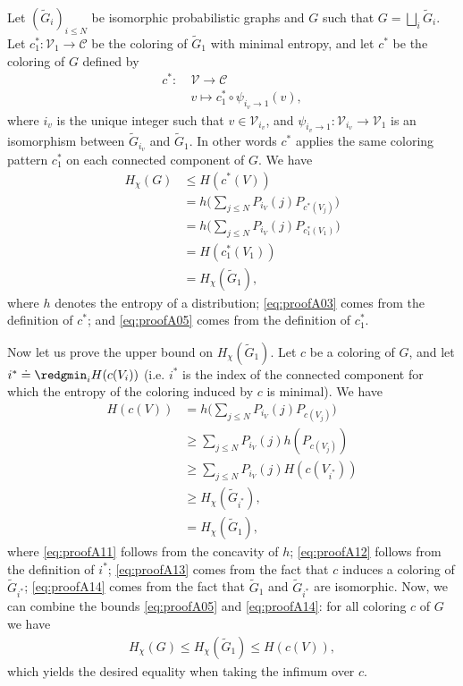 \documentclass[conference,a4paper]{IEEEtran}
\begin{document}
    Let $(\tilde{G}_i)_{i \leq N}$ be isomorphic probabilistic graphs and $G$ such that $G = \bigsqcup_i \tilde{G}_i$. Let $c_1^* : \mathcal{V}_1 \rightarrow \mathcal{C}$ be the coloring of $\tilde{G}_1$ with minimal entropy, and let $c^*$ be the coloring of $G$ defined by
    \begin{align}
        c^* : \: & \mathcal{V} \rightarrow \mathcal{C} \\
        & v \mapsto c_1^* \circ \psi_{i_v \rightarrow 1}(v),
    \end{align}
    where $i_v$ is the unique integer such that $v \in \mathcal{V}_{i_v}$, and $\psi_{i_v \rightarrow 1} : \mathcal{V}_{i_v} \rightarrow \mathcal{V}_1$ is an isomorphism between $\tilde{G}_{i_v}$ and $\tilde{G}_1$. In other words $c^*$ applies the same coloring pattern $c^*_1$ on each connected component of $G$. We have
    \begin{align}
    H_\chi(G) & \leq H(c^*(V)) \label{eq:proofA01}\\
    & = h\Big(\sum_{j \leq N} P_{i_V}(j) P_{c^*(V_j)}\Big) \\
    & = h\Big(\sum_{j \leq N} P_{i_V}(j) P_{c_1^*(V_1)}\Big) \label{eq:proofA03}\\
    & = H(c^*_1(V_1)) \\
    & = H_\chi(\tilde{G}_1),\label{eq:proofA05}
    \end{align}
    where $h$ denotes the entropy of a distribution; \eqref{eq:proofA03} comes from the definition of $c^*$; and \eqref{eq:proofA05} comes from the definition of $c_1^*$.
    
    Now let us prove the upper bound on $H_\chi(\tilde{G}_1)$. Let $c$ be a coloring of $G$, and let $i^* \doteq \redgmin_i H(c(V_i))$ (i.e. $i^*$ is the index of the connected component for which the entropy of the coloring induced by $c$ is minimal). We have
    \begin{align}
    H(c(V)) & = h\Big(\sum_{j \leq N} P_{i_V}(j) P_{c(V_j)}\Big) \label{eq:proofA10} \\
    & \geq \sum_{j \leq N} P_{i_V}(j) h(P_{c(V_j)}) \label{eq:proofA11} \\
    & \geq \sum_{j \leq N} P_{i_V}(j) H(c(V_{i^*})) \label{eq:proofA12} \\
    & \geq H_\chi(\tilde{G}_{i^*}),\label{eq:proofA13} \\
    & = H_\chi(\tilde{G}_1),\label{eq:proofA14}
    \end{align}
    where \eqref{eq:proofA11} follows from the concavity of $h$; \eqref{eq:proofA12} follows from the definition of $i^*$; \eqref{eq:proofA13} comes from the fact that $c$ induces a coloring of $\tilde{G}_{i^*}$; \eqref{eq:proofA14} comes from the fact that $\tilde{G}_1$ and $\tilde{G}_{i^*}$ are isomorphic. Now, we can combine the bounds \eqref{eq:proofA05} and \eqref{eq:proofA14}: for all coloring $c$ of $G$ we have
    \begin{align}
        H_\chi(G) \leq H_\chi(\tilde{G}_1) \leq H(c(V)),
    \end{align}
    which yields the desired equality when taking the infimum over $c$.
\fi
\end{document}

